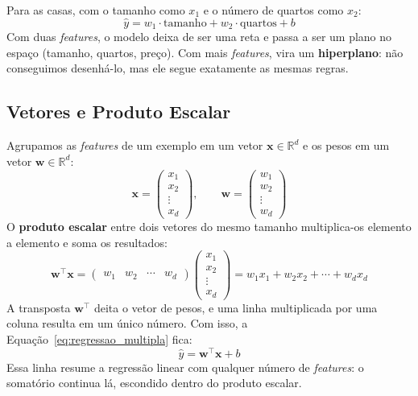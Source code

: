 \documentclass[a4paper,12pt,openany]{book}
\begin{document}
Para as casas, com o tamanho como \(x_1\) e o número de quartos como \(x_2\):
\[
\hat{y} = w_1 \cdot \text{tamanho} + w_2 \cdot \text{quartos} + b
\]
Com duas \textit{features}, o modelo deixa de ser uma reta e passa a ser um plano no espaço (tamanho, quartos, preço). Com mais \textit{features}, vira um \textbf{hiperplano}: não conseguimos desenhá-lo, mas ele segue exatamente as mesmas regras.

\subsection{Vetores e Produto Escalar}

Agrupamos as \textit{features} de um exemplo em um vetor \(\mathbf{x} \in \mathbb{R}^d\) e os pesos em um vetor \(\mathbf{w} \in \mathbb{R}^d\):
\[
\mathbf{x} = \begin{pmatrix} x_1 \\ x_2 \\ \vdots \\ x_d \end{pmatrix},
\qquad
\mathbf{w} = \begin{pmatrix} w_1 \\ w_2 \\ \vdots \\ w_d \end{pmatrix}
\]
O \textbf{produto escalar} entre dois vetores do mesmo tamanho multiplica-os elemento a elemento e soma os resultados:
\begin{equation}
\mathbf{w}^\top \mathbf{x} = \begin{pmatrix} w_1 & w_2 & \cdots & w_d \end{pmatrix} \begin{pmatrix} x_1 \\ x_2 \\ \vdots \\ x_d \end{pmatrix} = w_1 x_1 + w_2 x_2 + \cdots + w_d x_d
\end{equation}
A transposta \(\mathbf{w}^\top\) deita o vetor de pesos, e uma linha multiplicada por uma coluna resulta em um único número. Com isso, a Equação~\ref{eq:regressao_multipla} fica:
\begin{equation}\label{eq:modelo_vetorial}
\hat{y} = \mathbf{w}^\top \mathbf{x} + b
\end{equation}
Essa linha resume a regressão linear com qualquer número de \textit{features}: o somatório continua lá, escondido dentro do produto escalar.
\end{document}
